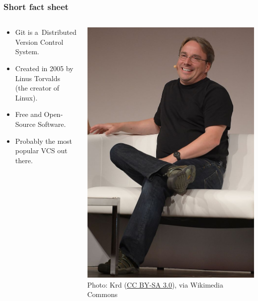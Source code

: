 \documentclass[12pt]{beamer}
\begin{document}
\begin{frame}
  \frametitle{Short fact sheet}

  \begin{columns}
    \begin{column}{.72\textwidth}
      \begin{itemize}
        \item Git is a~\alert{Distributed Version Control System}.
        \item Created in 2005 by \alert{Linus Torvalds}\\%
          (the creator of Linux).
        \item Free and Open-Source Software.
        \item Probably the most popular VCS out there.
      \end{itemize}
    \end{column}

    \begin{column}{.28\textwidth}
      {\tiny{}%
        \includegraphics[width=\textwidth]{images/linus-torvalds.jpg}\\%
        Photo: Krd (\href{https://creativecommons.org/licenses/by-sa/3.0}{CC BY-SA 3.0}),
        via Wikimedia Commons%
        \par%
      }
    \end{column}
  \end{columns}
\end{frame}
\end{document}

